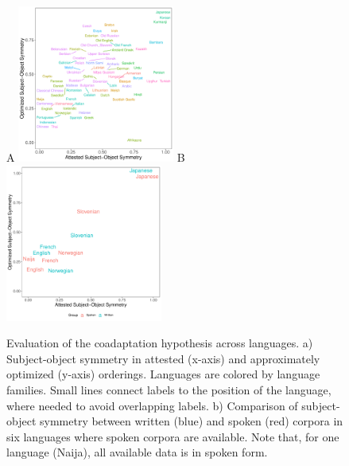\documentclass[11pt,a4paper]{article}
\newcommand\comment[1]{{\color{red}#1}}
\begin{document}





\begin{figure}
    \centering
    A
    \includegraphics[width=0.46\textwidth]{../analysis/figures/fracion-optimized_DLM_2.6_format.pdf}
    B
    \includegraphics[width=0.46\textwidth]{../analysis/analysis_spoken/spoken.pdf}
    \caption{Evaluation of the coadaptation hypothesis across languages. a) Subject-object symmetry in attested (x-axis) and approximately optimized (y-axis) orderings. Languages are colored by language families. Small lines connect labels to the position of the language, where needed to avoid overlapping labels. b) Comparison of subject-object symmetry between written (blue) and spoken (red) corpora in six languages where spoken corpora are available. Note that, for one language (Naija), all available data is in spoken form.}
    \label{fig:study1}\label{fig:spoken}
\end{figure}
\end{document}
